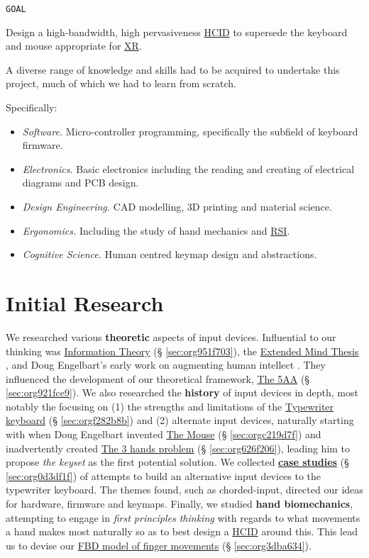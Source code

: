 \documentclass[logo,bsc,singlespacing,parskip]{infthesis}
\begin{document}
\begin{mdframed}
\begin{description}
\item[{\texttt{GOAL}}] 
\end{description}

Design a high-bandwidth, high pervasiveness \hyperref[orgc00eca5]{HCID} to supersede the keyboard and mouse appropriate for \hyperref[org1d567af]{XR}.
\end{mdframed}

A diverse range of knowledge and skills had to be acquired to undertake this project, much of which we had to learn from scratch.

Specifically:
\begin{itemize}
\item \emph{Software.} Micro-controller programming, specifically the subfield of keyboard firmware.
\item \emph{Electronics.} Basic electronics including the reading and creating of electrical diagrams and PCB design.
\item \emph{Design Engineering.} CAD modelling, 3D printing and material science.
\item \emph{Ergonomics.} Including the study of hand mechanics and \hyperref[orgdb95c62]{RSI}.
\item \emph{Cognitive Science.} Human centred keymap design and abstractions.
\end{itemize}
\chapter{Initial Research}
\label{sec:orgbd5ab1b}
We researched various \textbf{theoretic} aspects of input devices.
Influential to our thinking was \hyperref[sec:org951f703]{Information Theory} (§ \ref{sec:org951f703}), the \hyperref[extended mind thesis]{Extended Mind Thesis} \autocite{ExtendedMindAndy}, and Doug Engelbart's early work on augmenting human intellect \autocite{engelbartAugmentingHumanIntellect1962}.
They influenced the development of our theoretical framework, \hyperref[sec:org921fce9]{The 5AA} (§ \ref{sec:org921fce9}).
We also researched the \textbf{history} of input devices in depth, most notably the focusing on (1) the strengths and limitations of the \hyperref[sec:orgf282b8b]{Typewriter keyboard} (§ \ref{sec:orgf282b8b}) and (2) alternate input devices, naturally starting with when Doug Engelbart invented \hyperref[sec:orgc219d7f]{The Mouse} (§ \ref{sec:orgc219d7f}) and inadvertently created \hyperref[sec:org626f206]{The 3 hands problem} (§ \ref{sec:org626f206}), leading him to propose \emph{the keyset} as the first potential solution.
We collected \hyperref[sec:org0d3df1f]{\textbf{case studies}} (§ \ref{sec:org0d3df1f}) of attempts to build an alternative input devices to the typewriter keyboard.
The themes found, such as chorded-input, directed our ideas for hardware, firmware and keymaps.
Finally, we studied \textbf{hand biomechanics}, attempting to engage in \emph{first principles thinking} with regards to what movements a hand makes most naturally so as to best design a \hyperref[orgc00eca5]{HCID} around this.
This lead us to devise our \hyperref[sec:org3dba634]{FBD model of finger movements} (§ \ref{sec:org3dba634}).
\end{document}
